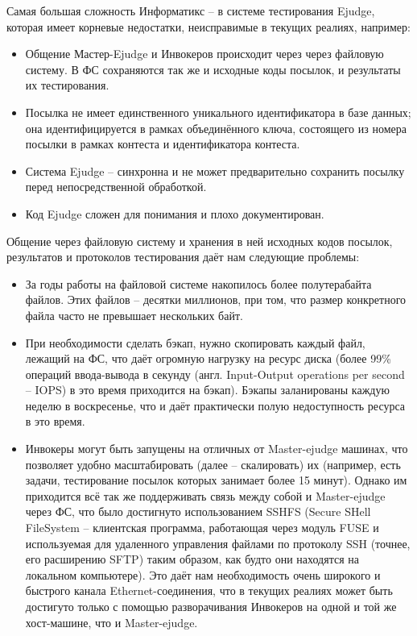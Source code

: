 Самая большая сложность Информатикс -- в системе тестирования Ejudge, которая имеет корневые недостатки, неисправимые в текущих реалиях, например:
\begin{itemize}
    \item Общение Мастер-Ejudge и Инвокеров происходит через через файловую систему\cite{ejudge_jobs}. 
    В ФС сохраняются так же и исходные коды посылок, и результаты их тестирования.
    \item Посылка не имеет единственного уникального идентификатора в базе данных; она идентифицируется в рамках объединённого ключа, состоящего из номера посылки в рамках контеста и идентификатора контеста.
    \item Система Ejudge -- синхронна и не может предварительно сохранить посылку перед непосредственной обработкой.
    \item Код Ejudge сложен для понимания и плохо документирован\cite{ejudge_source}.
\end{itemize}

Общение через файловую систему и хранения в ней исходных кодов посылок, результатов и протоколов тестирования даёт нам следующие проблемы:

\begin{itemize}
    \item За годы работы на файловой системе накопилось более полутерабайта файлов.
Этих файлов -- десятки миллионов, при том, что размер конкретного файла часто не превышает нескольких байт.
    \item При необходимости сделать бэкап, нужно скопировать каждый файл, лежащий на ФС, что даёт огромную нагрузку на ресурс диска
(более 99\% операций ввода-вывода в секунду (англ. Input-Output operations per second -- IOPS) в это время приходится на бэкап). 
Бэкапы заланированы каждую неделю в воскресенье, что и даёт практически полую недоступность ресурса в это время.
    \item Инвокеры могут быть запущены на отличных от Master-ejudge машинах, что позволяет удобно масштабировать (далее -- скалировать) их (например, есть задачи, тестирование посылок которых занимает более 15 минут). 
    Однако им приходится всё так же поддерживать связь между собой и Master-ejudge через ФС, 
    что было достигнуто использованием SSHFS (Secure SHell FileSystem -- клиентская программа, работающая через модуль FUSE и используемая для удаленного управления файлами по протоколу SSH (точнее, его расширению SFTP) таким образом, как будто они находятся на локальном компьютере).
    Это даёт нам необходимость очень широкого и быстрого канала Ethernet-соединения, что в текущих реалиях может быть достигуто только с помощью разворачивания Инвокеров на одной и той же хост-машине, что и Master-ejudge.

\end{itemize}{}


